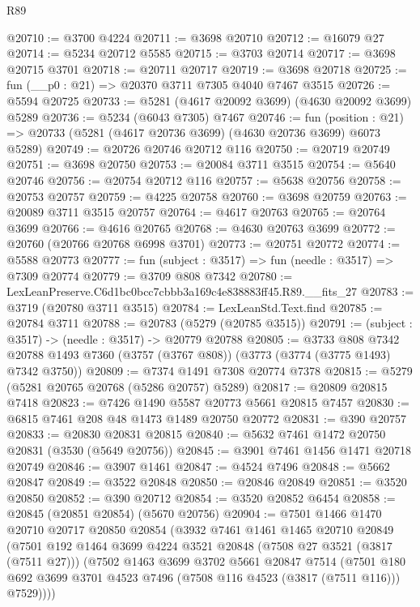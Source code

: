 \begin{lexlean}{R89}
\begin{coremodule}
@20710 := @3700 @4224
@20711 := @3698 @20710
@20712 := @16079 @27
@20714 := @5234 @20712 @5585
@20715 := @3703 @20714
@20717 := @3698 @20715 @3701
@20718 := @20711 @20717
@20719 := @3698 @20718
@20725 := fun (__p0 : @21) => @20370 @3711 @7305 @4040 @7467 @3515
@20726 := @5594 @20725
@20733 := @5281 (@4617 @20092 @3699) (@4630 @20092 @3699) @5289
@20736 := @5234 (@6043 @7305) @7467
@20746 := fun (position : @21) =>
  @20733 (@5281 (@4617 @20736 @3699) (@4630 @20736 @3699) @6073 @5289)
@20749 := @20726 @20746 @20712 @116
@20750 := @20719 @20749
@20751 := @3698 @20750
@20753 := @20084 @3711 @3515
@20754 := @5640 @20746
@20756 := @20754 @20712 @116
@20757 := @5638 @20756
@20758 := @20753 @20757
@20759 := @4225 @20758
@20760 := @3698 @20759
@20763 := @20089 @3711 @3515 @20757
@20764 := @4617 @20763
@20765 := @20764 @3699
@20766 := @4616 @20765
@20768 := @4630 @20763 @3699
@20772 := @20760 (@20766 @20768 @6998 @3701)
@20773 := @20751 @20772
@20774 := @5588 @20773
@20777 := fun (subject : @3517) => fun (needle : @3517) => @7309 @20774
@20779 := @3709 @808 @7342
@20780 := LexLeanPreserve.C6d1bc0bcc7cbbb3a169c4e838883ff45.R89.__fits_27
@20783 := @3719 (@20780 @3711 @3515)
@20784 := LexLeanStd.Text.find
@20785 := @20784 @3711
@20788 := @20783 (@5279 (@20785 @3515))
@20791 := (subject : @3517) -> (needle : @3517) -> @20779 @20788
@20805 := @3733
    @808
    @7342
    @20788
    @1493
    @7360
    (@3757 (@3767 @808))
    (@3773 (@3774 (@3775 @1493) @7342 @3750))
@20809 := @7374 @1491 @7308 @20774 @7378
@20815 := @5279 (@5281 @20765 @20768 (@5286 @20757) @5289)
@20817 := @20809 @20815 @7418
@20823 := @7426 @1490 @5587 @20773 @5661 @20815 @7457
@20830 := @6815 @7461 @208 @48 @1473 @1489 @20750 @20772
@20831 := @390 @20757
@20833 := @20830 @20831 @20815
@20840 := @5632 @7461 @1472 @20750 @20831 (@3530 (@5649 @20756))
@20845 := @3901 @7461 @1456 @1471 @20718 @20749
@20846 := @3907 @1461
@20847 := @4524 @7496
@20848 := @5662 @20847
@20849 := @3522 @20848
@20850 := @20846 @20849
@20851 := @3520 @20850
@20852 := @390 @20712
@20854 := @3520 @20852 @6454
@20858 := @20845 (@20851 @20854) (@5670 @20756)
@20904 := @7501
    @1466
    @1470
    @20710
    @20717
    @20850
    @20854
    (@3932
      @7461
      @1461
      @1465
      @20710
      @20849
      (@7501
        @192
        @1464
        @3699
        @4224
        @3521
        @20848
        (@7508 @27 @3521 (@3817 (@7511 @27)))
        (@7502
          @1463
          @3699
          @3702
          @5661
          @20847
          @7514
          (@7501 @180 @692 @3699 @3701 @4523 @7496 (@7508 @116 @4523 (@3817 (@7511 @116))) @7529))))

\end{coremodule}
\end{lexlean}
